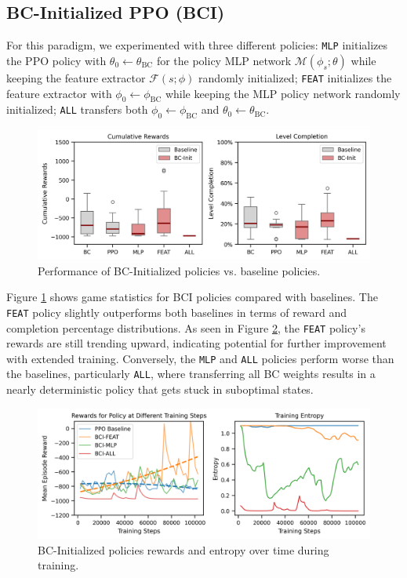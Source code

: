 \documentclass{article}
\begin{document}
\subsection{BC-Initialized PPO (BCI)}
For this paradigm, we experimented with three different policies: 
\texttt{MLP} initializes the PPO policy with $\theta_0 \leftarrow \theta_{\text{BC}}$ 
for the policy MLP network $\mathcal{M}(\phi_s; \theta)$ while keeping the feature 
extractor $\mathcal{F}(s;\phi)$ randomly initialized; \texttt{FEAT} initializes the 
feature extractor with $\phi_0 \leftarrow \phi_{\text{BC}}$ while keeping the MLP 
policy network randomly initialized; \texttt{ALL} transfers both $\phi_0 \leftarrow 
\phi_{\text{BC}}$ and $\theta_0 \leftarrow \theta_{\text{BC}}$.

\begin{figure}[h]
      \centering
      \includegraphics[width=\columnwidth]{figures/cum_rewards_bci.png}
      \caption{Performance of BC-Initialized policies vs. baseline policies.}
      \label{fig:res_bci}
\end{figure}

Figure \ref{fig:res_bci} shows game statistics for BCI policies compared 
with baselines. The \texttt{FEAT} policy slightly outperforms both baselines in 
terms of reward and completion percentage distributions. As seen in 
Figure \ref{fig:res_bci_deepdive}, the \texttt{FEAT} policy's rewards 
are still trending upward, indicating potential for further improvement 
with extended training. Conversely, the \texttt{MLP} and \texttt{ALL} 
policies perform worse than the baselines, particularly \texttt{ALL}, 
where transferring all BC weights results in a nearly deterministic 
policy that gets stuck in suboptimal states.

\begin{figure}[h]
      \centering
      \includegraphics[width=\columnwidth]{figures/bci-training.png}
      \caption{BC-Initialized policies rewards and entropy over time during
      training.}
      \label{fig:res_bci_deepdive}
\end{figure}
\end{document}
